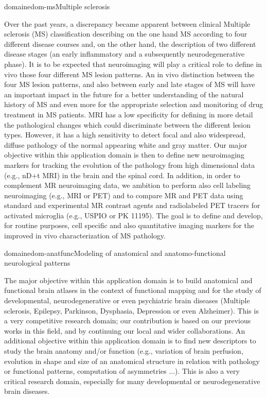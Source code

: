 \documentclass{ra2018}
\begin{document}
\begin{module}{domaine}{dom-ms}{Multiple sclerosis}

Over the past years, a discrepancy became apparent between clinical Multiple sclerosis (MS) classification describing on the one hand MS according to four different disease courses and, on the other hand, the description of two different disease stages (an early inflammatory and a subsequently neurodegenerative phase). It is to be expected that neuroimaging will play a critical role to define in vivo those four different MS lesion patterns. An in vivo distinction between the four MS lesion patterns, and also between early and late stages of MS will have an important impact in the future for a better understanding of the natural history of MS and even more for the appropriate selection and monitoring of drug treatment in MS patients. MRI has a low specificity for defining in more detail the pathological changes which could discriminate between the different lesion types. However, it has a high sensitivity to detect focal and also widespread, diffuse pathology of the normal appearing white and gray matter. Our major objective within this application domain is then to define new neuroimaging markers for tracking the evolution of the pathology from high dimensional data (e.g., nD+t MRI) in the brain and the spinal cord. In addition, in order to complement MR neuroimaging data, we ambition to perform also cell labeling neuroimaging (e.g., MRI or PET) and to compare MR and PET data using standard and experimental MR contrast agents and radiolabeled PET tracers for activated microglia (e.g., USPIO or PK 11195). The goal is to define and develop, for routine purposes, cell specific and also quantitative imaging markers for the improved in vivo characterization of MS pathology. 

\end{module}

\begin{module}{domaine}{dom-anatfunc}{Modeling of anatomical and anatomo-functional neurological patterns}

The major objective within this application domain is to build anatomical and functional brain atlases in the context of functional mapping and for the study of developmental, neurodegenerative or even psychiatric brain diseases (Multiple sclerosis, Epilepsy, Parkinson, Dysphasia, Depression or even Alzheimer). This is a very competitive research domain; our contribution is based on our previous works in this field, and by continuing our local and wider collaborations. An additional objective within this application domain is to find new descriptors to study the brain anatomy and/or function (e.g., variation of brain perfusion, evolution in shape and size of an anatomical structure in relation with pathology or functional patterns, computation of asymmetries ...). This is also a very critical research domain, especially for many developmental or neurodegenerative brain diseases. 

\end{module}
\end{document}
